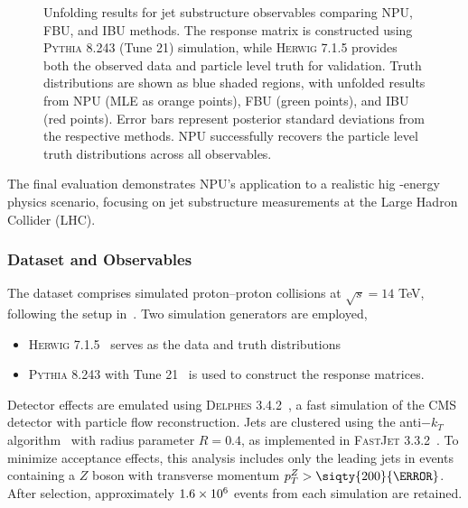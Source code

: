 \begin{figure}
\caption[Jet substructure unfolding results using NPU, FBU, and IBU]{Unfolding results for jet substructure observables comparing NPU, FBU, and IBU methods.
The response matrix is constructed using \textsc{Pythia} 8.243 (Tune 21) simulation, while \textsc{Herwig} 7.1.5 provides both the observed data and particle level truth for validation.
%
Truth distributions are shown as blue shaded regions, with unfolded results from NPU (MLE as orange points), FBU (green points), and IBU (red points).
%
Error bars represent posterior standard deviations from the respective methods.
%
NPU successfully recovers the particle level truth distributions across all observables.\footnotemark
}
\label{fig:substructure}
\end{figure}

    The final evaluation demonstrates NPU's application to a realistic hig -energy physics scenario, focusing on jet substructure measurements at the Large Hadron Collider (LHC).
    \subsubsection{Dataset and Observables}
        The dataset comprises simulated proton--proton collisions at $\sqrt{s} = 14$ TeV, following the setup in~\cite{andreassen_omnifold_2020}.
        Two simulation generators are employed,
        \begin{itemize}
            \item \textsc{Herwig 7.1.5}~\cite{Bellm2017HerwigNote} serves as the data and truth distributions
            \item \textsc{Pythia 8.243} with Tune 21~\cite{bierlich_comprehensive_2022} is used to construct the response matrices.
        \end{itemize}
        
        Detector effects are emulated using \textsc{Delphes 3.4.2}~\cite{DeFavereau2014DELPHESExperiment}, a fast simulation of the CMS detector with particle flow reconstruction.
        Jets are clustered using the anti$-k_T$ algorithm~\cite{Cacciari2008TheAlgorithm} with radius parameter $R = 0.4$, as implemented in \textsc{FastJet 3.3.2}~\cite{Cacciari2012FastJetManual}.
        To minimize acceptance effects, this analysis includes only the leading jets in events containing a \(Z\) boson with transverse momentum \(p_T^Z > \siqty{200}{\GeV}\).
        After selection, approximately \(\num{1.6d6}\) events from each simulation are retained.

